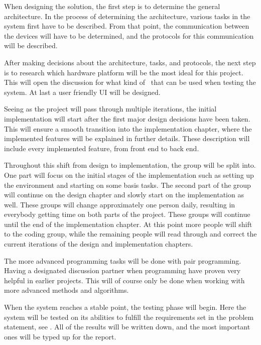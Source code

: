 
When designing the solution, the first step is to determine the general architecture. In the process of determining the architecture, various tasks in the system first have to be described. From that point, the communication between the devices will have to be determined, and the protocols for this communication will be described.

After making decisions about the architecture, tasks, and protocols, the next step is to research which hardware platform will be the most ideal for this project. This will open the discussion for what kind of \sdevs~that can be used when testing the system. At last a user friendly UI will be designed.

Seeing as the project will pass through multiple iterations, the initial implementation will start after the first major design decisions have been taken. This will ensure a smooth transition into the implementation chapter, where the implemented features will be explained in further details. These description will include every implemented feature, from front end to back end.

Throughout this shift from design to implementation, the group will be split into. One part will focus on the initial stages of the implementation such as setting up the environment and starting on some basis tasks. The second part of the group will continue on the design chapter and slowly start on the implementation as well. These groups will change approximately one person daily, resulting in everybody getting time on both parts of the project. These groups will continue until the end of the implementation chapter. At this point more people will shift to the coding group, while the remaining people will read through and correct the current iterations of the design and implementation chapters.

The more advanced programming tasks will be done with pair programming. Having a designated discussion partner when programming have proven very helpful in earlier projects. This will of course only be done when working with more advanced methods and algorithms.

When the system reaches a stable point, the testing phase will begin. Here the system will be tested on its abilities to fulfill the requirements set in the problem statement, see . All of the results will be written down, and the most important ones will be typed up for the report.

